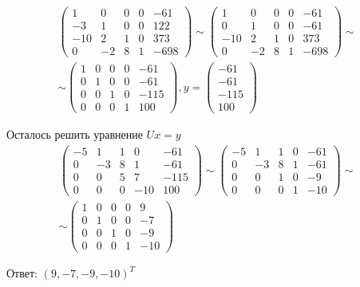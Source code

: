 \documentclass[a4paper,12pt]{report} %
\begin{document}
\begin{gather*}
	\begin{pmatrix}
		1 & 0 & 0 & 0 & -61\\
		-3 & 1 & 0 & 0 & 122\\
		-10 & 2 & 1 & 0 & 373\\
		0 & -2 & 8 & 1 & -698
	\end{pmatrix} \sim
	\begin{pmatrix}
		1 & 0 & 0 & 0 & -61\\
		0 & 1 & 0 & 0 & -61\\
		-10 & 2 & 1 & 0 & 373\\
		0 & -2 & 8 & 1 & -698
	\end{pmatrix} \sim \\ \sim
	\begin{pmatrix}
		1 & 0 & 0 & 0 & -61\\
		0 & 1 & 0 & 0 & -61\\
		0 & 0 & 1 & 0 & -115\\
		0 & 0 & 0 & 1 & 100
	\end{pmatrix}, y = 
	\begin {pmatrix}
		-61 \\ -61 \\ -115 \\ 100
	\end{pmatrix}
\end{gather*}

Осталось решить уравнение $Ux = y$
\begin{gather*}
	\begin{pmatrix}
		-5 & 1 & 1 & 0 & -61\\
		0 & -3 & 8 & 1 & -61\\
		0 & 0 & 5 & 7 & -115\\
		0 & 0 & 0 & -10 & 100
	\end{pmatrix} \sim 
	\begin{pmatrix}
		-5 & 1 & 1 & 0 & -61\\
		0 & -3 & 8 & 1 & -61\\
		0 & 0 & 1 & 0 & -9\\
		0 & 0 & 0 & 1 & -10
	\end{pmatrix} \sim \\ \sim
	\begin{pmatrix}
		1 & 0 & 0 & 0 & 9\\
		0 & 1 & 0 & 0 & -7\\
		0 & 0 & 1 & 0 & -9\\
		0 & 0 & 0 & 1 & -10
	\end{pmatrix}
\end{gather*}

Ответ: $(9, -7, -9, -10)^T$
\end{document}
